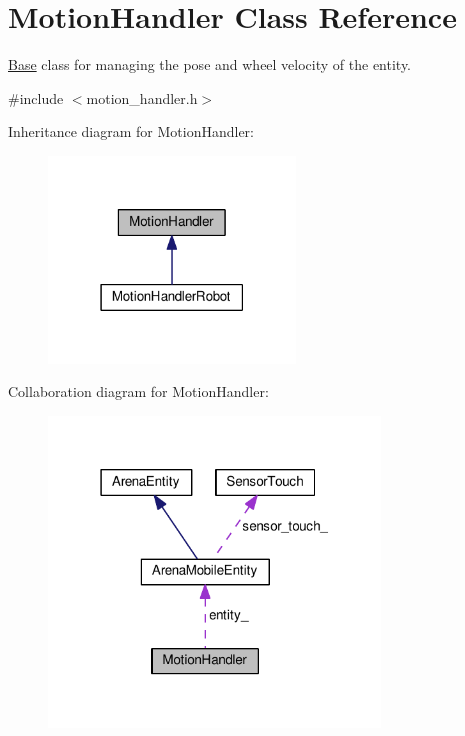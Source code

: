 \hypertarget{classMotionHandler}{}\section{Motion\+Handler Class Reference}
\label{classMotionHandler}


\hyperlink{classBase}{Base} class for managing the pose and wheel velocity of the entity.  




{\ttfamily \#include $<$motion\+\_\+handler.\+h$>$}



Inheritance diagram for Motion\+Handler\+:
\nopagebreak
\begin{figure}[H]
\begin{center}
\leavevmode
\includegraphics[width=186pt]{classMotionHandler__inherit__graph}
\end{center}
\end{figure}


Collaboration diagram for Motion\+Handler\+:
\nopagebreak
\begin{figure}[H]
\begin{center}
\leavevmode
\includegraphics[width=250pt]{classMotionHandler__coll__graph}
\end{center}
\end{figure}
